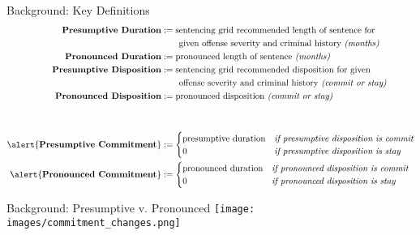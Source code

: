 \documentclass[10pt]{beamer}
\begin{document}
{\footnotesize
\begin{frame}{Background: Key Definitions}
    \begin{align*}
        \textbf{Presumptive Duration} & := \text{sentencing grid recommended length of sentence for} \\
                              & \quad\quad \text{given offense severity and criminal history \textit{(months)}} \\
        \textbf{Pronounced Duration} & := \text{pronounced length of sentence \textit{(months)}} \\
        \textbf{Presumptive Disposition} & := \text{sentencing grid recommended disposition for given} \\
                              & \quad\quad \text{offense severity and criminal history \textit{(commit or stay)}} \\
        \textbf{Pronounced Disposition} & := \text{pronounced disposition \textit{(commit or stay)}} \\
        & \\
        & \\
        \alert{\textbf{Presumptive Commitment}} & := \begin{cases} 
                                                  \text{presumptive duration} & \textit{if presumptive disposition is commit}  \\
                                                  0 & \textit{if presumptive disposition is stay}  \\
                                            \end{cases} \\
        \alert{\textbf{Pronounced Commitment}} & := \begin{cases} 
                                                  \text{pronounced duration} & \textit{if pronounced disposition is commit}  \\
                                                  0 & \textit{if pronounced disposition is stay}  \\
                                            \end{cases} \\
    \end{align*}
\end{frame}
}

\begin{frame}{Background: Presumptive v. Pronounced}
    \vspace*{1.00cm}
    \hspace*{-0.75cm}
    \texttt{[image: images/commitment\_changes.png]}
\end{frame}
\end{document}
